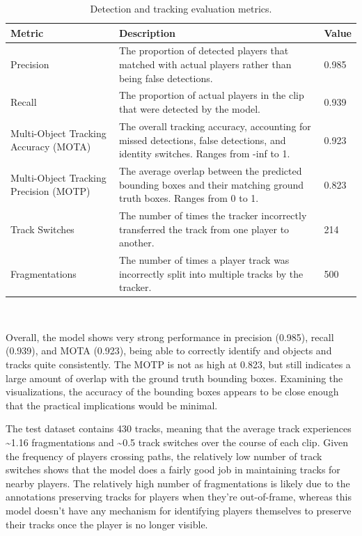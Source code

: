 \documentclass[12pt,stu,donotrepeattitle,floatsintext]{apa7}
\begin{document}
    \begin{table}[htb]
        \centering
        \renewcommand{\arraystretch}{1}
        \begin{tabular}{|p{5cm}|p{8cm}|p{2cm}|}
            \hline
            \textbf{Metric} & \textbf{Description} & \textbf{Value} \\ \hline
            Precision & The proportion of detected players that matched with actual players rather than being false detections. & 0.985 \\ \hline
            Recall & The proportion of actual players in the clip that were detected by the model. & 0.939 \\ \hline
            Multi-Object Tracking Accuracy (MOTA) & The overall tracking accuracy, accounting for missed detections, false detections, and identity switches. Ranges from -inf to 1. & 0.923 \\ \hline
            Multi-Object Tracking Precision (MOTP) & The average overlap between the predicted bounding boxes and their matching ground truth boxes. Ranges from 0 to 1. & 0.823 \\ \hline
            Track Switches & The number of times the tracker incorrectly transferred the track from one player to another. & 214 \\ \hline
            Fragmentations & The number of times a player track was incorrectly split into multiple tracks by the tracker. & 500 \\ \hline
        \end{tabular}
        \\[10pt]
        \caption{Detection and tracking evaluation metrics.}
        \label{tab:evaluation-metrics}
    \end{table}

    Overall, the model shows very strong performance in precision (0.985), recall (0.939), and MOTA (0.923), being able to correctly identify and objects and tracks quite consistently.
    The MOTP is not as high at 0.823, but still indicates a large amount of overlap with the ground truth bounding boxes.
    Examining the visualizations, the accuracy of the bounding boxes appears to be close enough that the practical implications would be minimal.

    The test dataset contains 430 tracks, meaning that the average track experiences \textasciitilde1.16 fragmentations and \textasciitilde0.5 track switches over the course of each clip.
    Given the frequency of players crossing paths, the relatively low number of track switches shows that the model does a fairly good job in maintaining tracks for nearby players.
    The relatively high number of fragmentations is likely due to the annotations preserving tracks for players when they're out-of-frame, whereas this model doesn't have any mechanism for identifying players themselves to preserve their tracks once the player is no longer visible.
\end{document}
